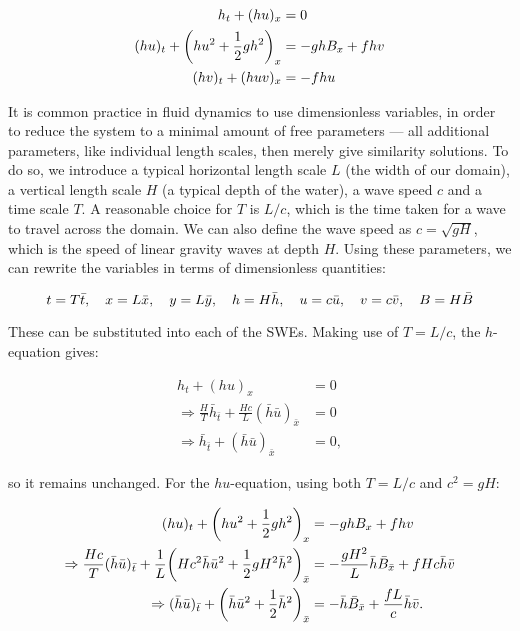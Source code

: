 \begin{subequations}
  \label{eq:swe}
  \begin{align}
                           h_t + (hu)_x & = 0 \\
    (hu)_t + \qty(hu^2 + \frac{1}{2}gh^2)_x & = - ghB_x + fhv \\
                       (hv)_t + (huv)_x & = - fhu
  \end{align}
\end{subequations}

It is common practice in fluid dynamics to use dimensionless variables, in order to reduce the system to a minimal amount of free parameters --- all additional parameters, like individual length scales, then merely give similarity solutions. To do so, we introduce a typical horizontal length scale $L$ (the width of our domain), a vertical length scale $H$ (a typical depth of the water), a wave speed $c$ and a time scale $T$. A reasonable choice for $T$ is $L/c$, which is the time taken for a wave to travel across the domain. We can also define the wave speed as $c = \sqrt{gH}$, which is the speed of linear gravity waves at depth $H$. Using these parameters, we can rewrite the variables in terms of dimensionless quantities:

\begin{equation}
  t = T\bar t\qc x = L\bar x\qc y = L\bar y\qc h = H\bar h\qc u = c\bar u\qc v = c\bar v\qc B = H\bar B \label{eq:scaling}
\end{equation}

These can be substituted into each of the SWEs. Making use of $T = L/c$, the $h$-equation gives:


\begin{align}
  h_t + (hu)_x & = 0 \\
  \Rightarrow \frac{H}{T} \bar h_{\bar t} + \frac{Hc}{L} (\bar h \bar u)_{\bar x} & = 0 \\
  \Rightarrow \bar h_{\bar t} + (\bar h \bar u)_{\bar x} & = 0,
\end{align}

so it remains unchanged. For the $hu$-equation, using both $T = L/c$ and $c^2 = gH$:

\begin{align}
  (hu)_t + \qty(hu^2 + \frac{1}{2}gh^2)_x & = - ghB_x + fhv \\
  \Rightarrow \frac{Hc}{T}(\bar h\bar u)_{\bar t} + \frac{1}{L}\qty(Hc^2 \bar h\bar u^2 + \frac{1}{2}gH^2\bar h^2)_{\bar x} & = - \frac{gH^2}{L}\bar h\bar B_{\bar x} + fHc\bar h\bar v \\
  \Rightarrow (\bar h\bar u)_{\bar t} + \qty(\bar h\bar u^2 + \frac{1}{2} \bar h^2)_{\bar x} & = - \bar h\bar B_{\bar x} + \frac{fL}{c}\bar h\bar v.
\end{align}

